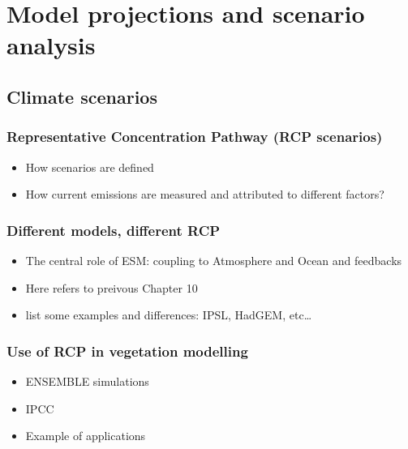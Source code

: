 \documentclass[12pt,oneside]{book}
\providecommand{\tightlist}{%
  \setlength{\itemsep}{0pt}\setlength{\parskip}{0pt}}
\begin{document}
\chapter{Model projections and scenario
analysis}\label{model-projections-and-scenario-analysis}


\section{Climate scenarios}\label{climate-scenarios}

\subsection{Representative Concentration Pathway (RCP
scenarios)}\label{representative-concentration-pathway-rcp-scenarios}

\begin{itemize}
\tightlist
\item
  How scenarios are defined
\item
  How current emissions are measured and attributed to different
  factors?
\end{itemize}

\subsection{Different models, different
RCP}\label{different-models-different-rcp}

\begin{itemize}
\tightlist
\item
  The central role of ESM: coupling to Atmosphere and Ocean and
  feedbacks
\item
  Here refers to preivous Chapter 10
\item
  list some examples and differences: IPSL, HadGEM, etc\ldots{}
\end{itemize}

\subsection{Use of RCP in vegetation
modelling}\label{use-of-rcp-in-vegetation-modelling}

\begin{itemize}
\tightlist
\item
  ENSEMBLE simulations
\item
  IPCC
\item
  Example of applications
\end{itemize}
\end{document}
